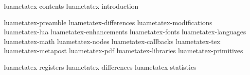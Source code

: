 \startfrontmatter
    \component luametatex-contents
    \component luametatex-introduction
\stopfrontmatter

\startbodymatter
    \component luametatex-preamble
    \component luametatex-differences
    \component luametatex-modifications
    \component luametatex-lua
    \component luametatex-enhancements
    \component luametatex-fonts
    \component luametatex-languages
    \component luametatex-math
    \component luametatex-nodes
    \component luametatex-callbacks
    \component luametatex-tex
    \component luametatex-metapost
    \component luametatex-pdf
    \component luametatex-libraries
    \component luametatex-primitives
\stopbodymatter

\startbackmatter
    \component luametatex-registers
    \component luametatex-differences
    \component luametatex-statistics
\stopbackmatter

\stopdocument

